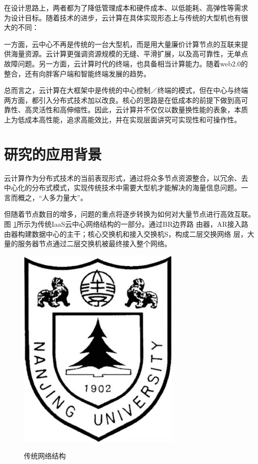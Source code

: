 \documentclass[oneside, phd]{njuthesis}
\begin{document}
在设计思路上，两者都为了降低管理成本和硬件成本、以低能耗、高弹性等需求
为设计目标。随着技术的进步，云计算在具体实现形态上与传统的大型机也有很
大的不同：

一方面，云中心不再是传统的一台大型机，而是用大量廉价计算节点的互联来提
供海量资源。云计算更强调资源规模的无缝、平滑扩展，以及高可靠性，无单点
故障问题。另一方面，云计算时代的终端，也具备相当计算能力。随着web2.0的
整合，还有向胖客户端和智能终端发展的趋势。

总而言之，云计算在大框架中是传统的中心控制／终端的模式，但在中心与终端
两方面，都引入分布式技术加以改良。核心的思路是在低成本的前提下做到高可
靠性、高灵活性和高伸缩性。因此，云计算并不仅仅以数量换性能的表象，本质
上为低成本高性能，追求高能效比，并在实现层面讲究可实现性和可操作性。

\section{研究的应用背景}

云计算作为分布式技术的当前表现形式，通过将众多节点资源整合，以冗余、去
中心化的分布式模式，实现传统技术中需要大型机才能解决的海量信息问题。一
言而概之，“人多力量大”。

但随着节点数目的增多，问题的重点将逐步转换为如何对大量节点进行高效互联。图
\ref{fig:traditional_network}所示为传统IaaS云中心网络结构的一部分。通过BR边界路
由器，AR接入路由器构建数据中心的主干；核心交换机和接入交换机S，构成二层交换网络
层，大量的服务器节点通过二层交换机被最终接入整个网络。

\begin{figure}[htbp]
  \centering
  \includegraphics[width= 0.7\textwidth]{njulogo.eps}\\
  \caption{传统网络结构}\label{fig:traditional_network}
\end{figure}
\end{document}
